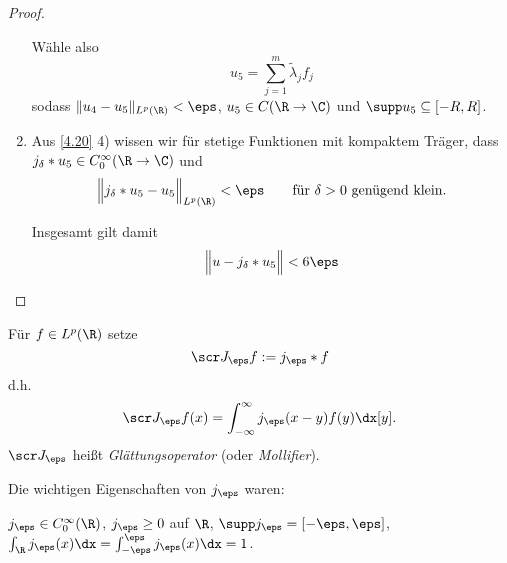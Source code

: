 \begin{st}
\begin{proof}
\begin{enumerate}[1)]
				Wähle also
				\[
					u_5 = \sum_{j=1}^m \tilde \lambda_j f_j
				\]
				sodass $\|u_4 - u_5\|_{L^p(\R)} < \eps$, $u_5 \in C(\R \to \C)$ und $\supp u_5 \subset [-R,R]$.
			\item
				Aus \ref{4.20} 4) wissen wir für stetige Funktionen mit kompaktem Träger, dass $j_\delta \ast u_5 \in C_0^\infty(\R \to \C)$ und
				\[
					\Big\|j_\delta \ast u_5 - u_5 \Big\|_{L^p(\R)} < \eps \qquad \text{für $\delta > 0$ genügend klein.}
				\]

				Insgesamt gilt damit
				\[
					\Big\|u - j_\delta \ast u_5 \Big\| < 6\eps
				\]
		\end{enumerate}
	\end{proof}
\end{st}

\begin{df} \label{4.19}
	Für $f \in L^p(\R)$ setze
	\[
		\scr J_\eps f := j_\eps \ast f
	\]
	d.h.
	\[
		\scr J_\eps f(x) = \int_{-\infty}^\infty j_\eps (x-y) f(y) \dx[y].
	\]
	$\scr J_\eps$ heißt \emph{Glättungsoperator} (oder \emph{Mollifier}).
	\begin{note}
		Die wichtigen Eigenschaften von $j_\eps$ waren:

		$j_\eps \in C_0^\infty(\R)$, $j_\eps \ge 0$ auf $\R$, $\supp j_\eps = [-\eps,\eps]$, $\int_{\R} j_\eps(x) \dx = \int_{-\eps}^\eps j_\eps(x) \dx = 1$.
	\end{note}
\end{df}

